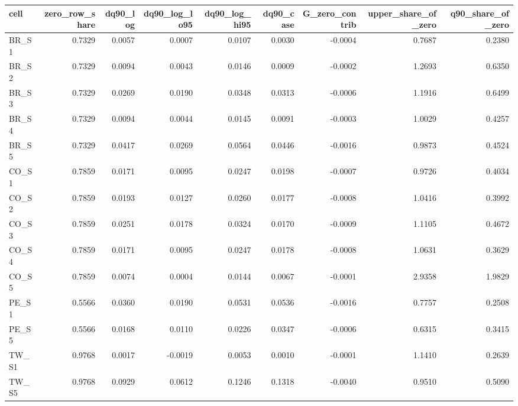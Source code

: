 \begin{tabular}{lrrrrrrrr}
\toprule
cell & zero\_row\_share & dq90\_log & dq90\_log\_lo95 & dq90\_log\_hi95 & dq90\_case & G\_zero\_contrib & upper\_share\_of\_zero & q90\_share\_of\_zero \\
\midrule
BR\_S1 & 0.7329 & 0.0057 & 0.0007 & 0.0107 & 0.0030 & -0.0004 & 0.7687 & 0.2380 \\
BR\_S2 & 0.7329 & 0.0094 & 0.0043 & 0.0146 & 0.0009 & -0.0002 & 1.2693 & 0.6350 \\
BR\_S3 & 0.7329 & 0.0269 & 0.0190 & 0.0348 & 0.0313 & -0.0006 & 1.1916 & 0.6499 \\
BR\_S4 & 0.7329 & 0.0094 & 0.0044 & 0.0145 & 0.0091 & -0.0003 & 1.0029 & 0.4257 \\
BR\_S5 & 0.7329 & 0.0417 & 0.0269 & 0.0564 & 0.0446 & -0.0016 & 0.9873 & 0.4524 \\
CO\_S1 & 0.7859 & 0.0171 & 0.0095 & 0.0247 & 0.0198 & -0.0007 & 0.9726 & 0.4034 \\
CO\_S2 & 0.7859 & 0.0193 & 0.0127 & 0.0260 & 0.0177 & -0.0008 & 1.0416 & 0.3992 \\
CO\_S3 & 0.7859 & 0.0251 & 0.0178 & 0.0324 & 0.0170 & -0.0009 & 1.1105 & 0.4672 \\
CO\_S4 & 0.7859 & 0.0171 & 0.0095 & 0.0247 & 0.0178 & -0.0008 & 1.0631 & 0.3629 \\
CO\_S5 & 0.7859 & 0.0074 & 0.0004 & 0.0144 & 0.0067 & -0.0001 & 2.9358 & 1.9829 \\
PE\_S1 & 0.5566 & 0.0360 & 0.0190 & 0.0531 & 0.0536 & -0.0016 & 0.7757 & 0.2508 \\
PE\_S5 & 0.5566 & 0.0168 & 0.0110 & 0.0226 & 0.0347 & -0.0006 & 0.6315 & 0.3415 \\
TW\_S1 & 0.9768 & 0.0017 & -0.0019 & 0.0053 & 0.0010 & -0.0001 & 1.1410 & 0.2639 \\
TW\_S5 & 0.9768 & 0.0929 & 0.0612 & 0.1246 & 0.1318 & -0.0040 & 0.9510 & 0.5090 \\
\bottomrule
\end{tabular}
